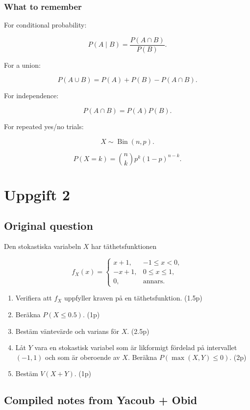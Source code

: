 \documentclass[10pt]{article}
\begin{document}
\subsubsection*{What to remember}
For conditional probability:

\[
P(A\mid B)
=
\frac{P(A\cap B)}{P(B)}.
\]

For a union:

\[
P(A\cup B)
=P(A)+P(B)-P(A\cap B).
\]

For independence:

\[
P(A\cap B)=P(A)P(B).
\]

For repeated yes/no trials:

\[
X\sim \operatorname{Bin}(n,p).
\]

\[
P(X=k)
=
\binom{n}{k}p^k(1-p)^{n-k}.
\]

\section*{Uppgift 2}

\subsection*{Original question}
Den stokastiska variabeln \(X\) har täthetsfunktionen

\[
f_X(x)=
\begin{cases}
x+1, & -1\le x<0,\\
-x+1, & 0\le x\le 1,\\
0, & \text{annars}.
\end{cases}
\]

\begin{enumerate}[label=\alph*)]
\item Verifiera att \(f_X\) uppfyller kraven på en
täthetsfunktion.
\hfill (1.5p)

\item Beräkna \(P(X\le 0.5)\).
\hfill (1p)

\item Bestäm väntevärde och varians för \(X\).
\hfill (2.5p)

\item Låt \(Y\) vara en stokastisk variabel som är
likformigt fördelad på intervallet \((-1,1)\) och som
är oberoende av \(X\).
Beräkna \(P(\max(X,Y)\le 0)\).
\hfill (2p)

\item Bestäm \(V(X+Y)\).
\hfill (1p)
\end{enumerate}

\subsection*{Compiled notes from Yacoub + Obid}
\end{document}

